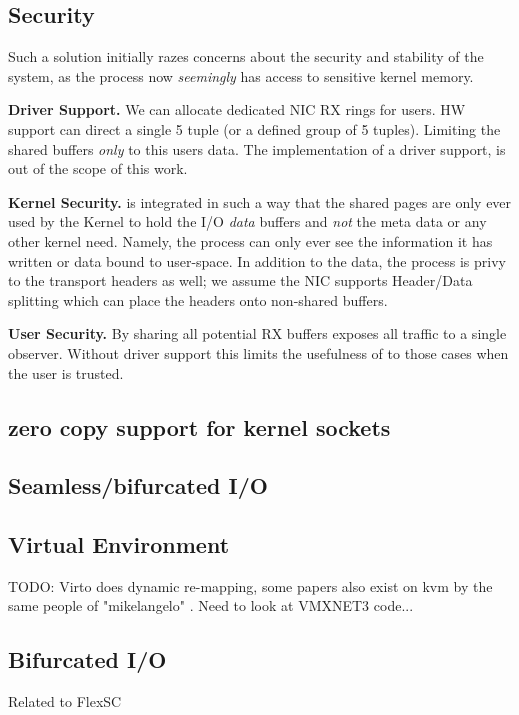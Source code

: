 \subsection{Security}
Such a solution initially razes concerns about the security and stability of the system, as the process now \emph{seemingly} has access to sensitive kernel memory. 

\noindent\textbf{Driver Support.} We can allocate dedicated NIC RX rings for \oursys users. HW support\cite{flow_direct} can direct a single 5 tuple (or a defined group of 5 tuples). Limiting the shared buffers \emph{only} to this users data. The implementation of a driver support, is out of the scope of this work. 

\noindent\textbf{Kernel Security.} \oursys is integrated in such a way that the shared pages are only ever used by the Kernel to hold the I/O \emph{data} buffers and \emph{not} the meta data or any other kernel need. Namely, the process can only ever see the information it has written or data bound to user-space. In addition to the data, the process is privy to the transport headers as well; we assume the NIC supports Header/Data splitting\cite{hds} which can place the headers onto non-shared buffers.

\noindent\textbf{User Security.} By sharing all potential RX buffers \oursys exposes all traffic to a single observer.
Without driver support this limits the usefulness of \oursys to those cases when the user is trusted. 

\subsection{zero copy support for kernel sockets}
\subsection{Seamless/bifurcated I/O}
\subsection{Virtual Environment}
TODO: Virto does dynamic re-mapping, some papers also exist on kvm by the same people of "mikelangelo" \cite{mikelangelo}. Need to look at VMXNET3 code...
\subsection{Bifurcated I/O}
Related to FlexSC \cite{flexsc}